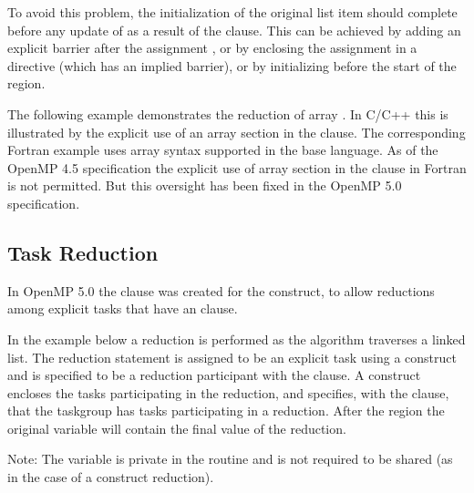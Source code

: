 To avoid this problem, the initialization of the original list item  
should complete before any update of  as a result of the  
clause. This can be achieved by adding an explicit barrier after the assignment 
, or by enclosing the assignment  in a  
directive (which has an implied barrier), or by initializing  before 
the start of the  region.



The following example demonstrates the reduction of array .  In C/C++ this is illustrated by the explicit use of an array section  in the  clause.  The corresponding Fortran example uses array syntax supported in the base language.  As of the OpenMP 4.5 specification the explicit use of array section in the  clause in Fortran is not permitted.  But this oversight has been fixed in the OpenMP 5.0 specification.




\subsection{Task Reduction}
\label{subsec:task_reduction}

In OpenMP 5.0 the  clause was created for the  construct, 
to allow reductions among explicit tasks that have an  clause.

In the  example below a reduction is performed as the algorithm
traverses a linked list. The reduction statement is assigned to be an explicit task using
a  construct and is specified to be a reduction participant with 
the  clause.
A  construct encloses the tasks participating in the reduction, and
specifies, with the  clause, that the taskgroup has tasks participating
in a reduction.  After the  region the original variable will contain 
the final value of the reduction.

Note: The  variable is private in the  routine
and is not required to be shared (as in the case of a  construct
reduction).



